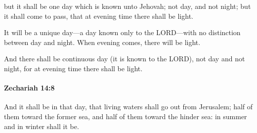 			\begin{versebox}
					\item[BHS] 
					\item[LXX] 
					\item[ASV] but it shall be one day which is known unto Jehovah; not day, and not night; but it shall come to pass, that at evening time there shall be light.
					\item[NIV] It will be a unique day—a day known only to the LORD—with no distinction between day and night. When evening comes, there will be light.
					\item[NRSV] And there shall be continuous day (it is known to the LORD), not day and not night, for at evening time there shall be light.
			\end{versebox}

		\paragraph{Zechariah 14:8} %
			\label{ZECHARIAH-14-8}

			And it shall be in that day, that living waters shall go out from Jerusalem; half of them toward the former sea, and half of them toward the hinder sea: in summer and in winter shall it be.

